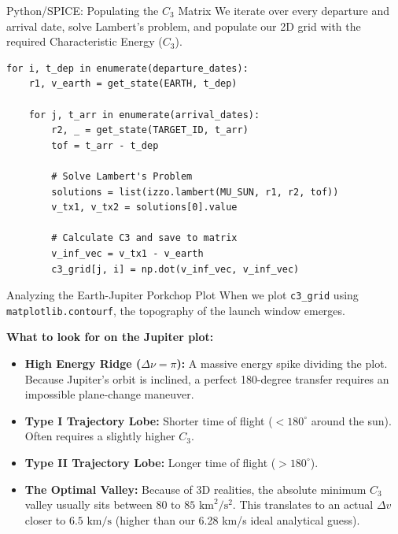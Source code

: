 \documentclass[11pt]{beamer}
\begin{document}
\begin{frame}[fragile]{Python/SPICE: Populating the $C_3$ Matrix}
    We iterate over every departure and arrival date, solve Lambert's problem, and populate our 2D grid with the required Characteristic Energy ($C_3$).
    
\begin{lstlisting}
for i, t_dep in enumerate(departure_dates):
    r1, v_earth = get_state(EARTH, t_dep)
    
    for j, t_arr in enumerate(arrival_dates):
        r2, _ = get_state(TARGET_ID, t_arr)
        tof = t_arr - t_dep
        
        # Solve Lambert's Problem
        solutions = list(izzo.lambert(MU_SUN, r1, r2, tof))
        v_tx1, v_tx2 = solutions[0].value 
        
        # Calculate C3 and save to matrix
        v_inf_vec = v_tx1 - v_earth
        c3_grid[j, i] = np.dot(v_inf_vec, v_inf_vec)
\end{lstlisting}
\end{frame}

\begin{frame}{Analyzing the Earth-Jupiter Porkchop Plot}
    When we plot \texttt{c3\_grid} using \texttt{matplotlib.contourf}, the topography of the launch window emerges.
    
    \vspace{0.3cm}
    \textbf{What to look for on the Jupiter plot:}
    \begin{itemize}
        \item \textbf{High Energy Ridge ($\Delta \nu = \pi$):} A massive energy spike dividing the plot. Because Jupiter's orbit is inclined, a perfect 180-degree transfer requires an impossible plane-change maneuver.
        \item \textbf{Type I Trajectory Lobe:} Shorter time of flight ($< 180^\circ$ around the sun). Often requires a slightly higher $C_3$.
        \item \textbf{Type II Trajectory Lobe:} Longer time of flight ($> 180^\circ$).
        \item \textbf{The Optimal Valley:} Because of 3D realities, the absolute minimum $C_3$ valley usually sits between \textbf{$80 \text{ to } 85 \text{ km}^2/\text{s}^2$}. This translates to an actual $\Delta v$ closer to \textbf{$6.5 \text{ km/s}$} (higher than our 6.28 km/s ideal analytical guess).
    \end{itemize}
\end{frame}
\end{document}

